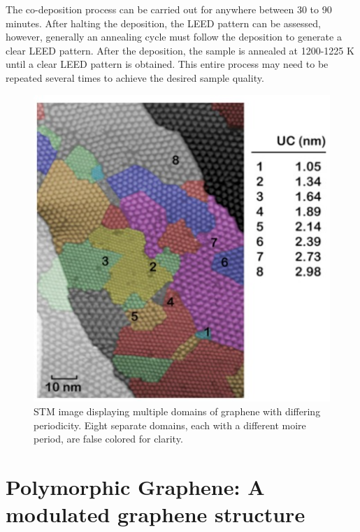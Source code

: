 The co-deposition process can be carried out for anywhere between 30 to 90 minutes. After halting the deposition, the LEED pattern can be assessed, however, generally an annealing cycle must follow the deposition to generate a clear LEED pattern. After the deposition, the sample is annealed at 1200-1225 K until a clear LEED pattern is obtained. This entire process may need to be repeated several times to achieve the desired sample quality. 

\begin{figure}
  \centering
  \includegraphics[scale=0.8]{./figs/moires.jpg}
  \caption{STM image displaying multiple domains of graphene with differing periodicity. Eight separate domains, each with a different moire period, are false colored for clarity.}
  \label{fig:polygraphene}
\end{figure}

\section{Polymorphic Graphene: A modulated graphene structure}

